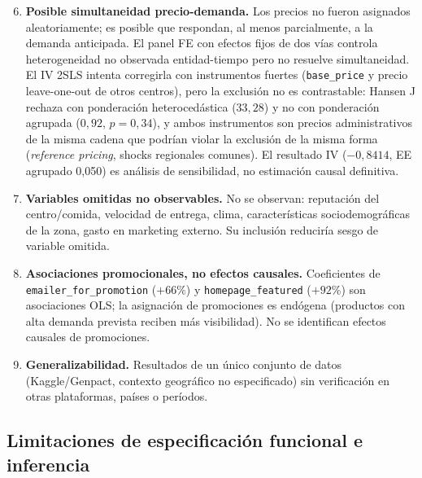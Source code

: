 \documentclass[doc, a4paper, biblatex, floatsintext, longtable, babel]{apa7}
\begin{document}
\begin{enumerate}
    \setcounter{enumi}{5}
    \item \textbf{Posible simultaneidad precio-demanda.} Los precios no fueron asignados aleatoriamente; es posible que respondan, al menos parcialmente, a la demanda anticipada. El panel FE con efectos fijos de dos vías controla heterogeneidad no observada entidad-tiempo pero no resuelve simultaneidad. El IV 2SLS intenta corregirla con instrumentos fuertes (\texttt{base\_price} y precio leave-one-out de otros centros), pero la exclusión no es contrastable: Hansen J rechaza con ponderación heterocedástica ($33,28$) y no con ponderación agrupada ($0,92$, $p=0,34$), y ambos instrumentos son precios administrativos de la misma cadena que podrían violar la exclusión de la misma forma (\textit{reference pricing}, shocks regionales comunes). El resultado IV ($-0,8414$, EE agrupado 0,050) es análisis de sensibilidad, no estimación causal definitiva.

    \item \textbf{Variables omitidas no observables.} No se observan: reputación del centro/comida, velocidad de entrega, clima, características sociodemográficas de la zona, gasto en marketing externo. Su inclusión reduciría sesgo de variable omitida.

    \item \textbf{Asociaciones promocionales, no efectos causales.} Coeficientes de \texttt{emailer\_for\_promotion} ($+66\%$) y \texttt{homepage\_featured} ($+92\%$) son asociaciones OLS; la asignación de promociones es endógena (productos con alta demanda prevista reciben más visibilidad). No se identifican efectos causales de promociones.

    \item \textbf{Generalizabilidad.} Resultados de un único conjunto de datos (Kaggle/Genpact, contexto geográfico no especificado) sin verificación en otras plataformas, países o períodos.
\end{enumerate}

\subsection*{Limitaciones de especificación funcional e inferencia}
\end{document}
